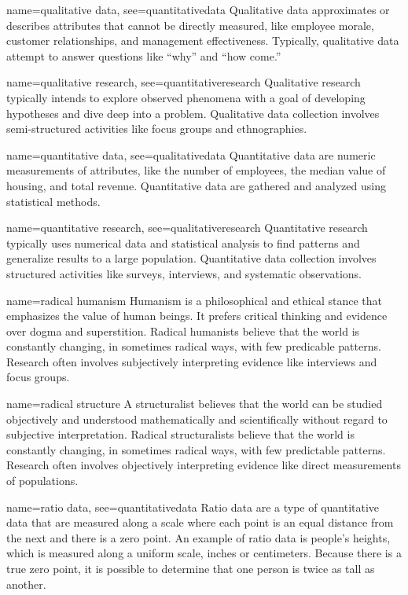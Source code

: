 {name={qualitative data},
	see={quantitativedata}}
{%
	Qualitative data approximates or describes attributes that cannot be directly measured, like employee morale, customer relationships, and management effectiveness. Typically, qualitative data attempt to answer questions like ``why'' and ``how come.'' 
}

{name={qualitative research},
	see={quantitativeresearch}}
{%
	Qualitative research typically intends to explore observed phenomena with a goal of developing hypotheses and dive deep into a problem. Qualitative data collection involves semi-structured activities like focus groups and ethnographies.
}

{name={quantitative data},
	see={qualitativedata}}
{%
	Quantitative data are numeric measurements of attributes, like the number of employees, the median value of housing, and total revenue. Quantitative data are gathered and analyzed using statistical methods.
}

{name={quantitative research},
	see={qualitativeresearch}}
{%
	Quantitative research typically uses numerical data and statistical analysis to find patterns and generalize results to a large population. Quantitative data collection involves structured activities like surveys, interviews, and systematic observations.
}

{name={radical humanism}}
{%
	Humanism is a philosophical and ethical stance that emphasizes the value of human beings. It prefers critical thinking and evidence over dogma and superstition. Radical humanists believe that the world is constantly changing, in sometimes radical ways, with few predicable patterns. Research often involves subjectively interpreting evidence like interviews and focus groups.
}

{name={radical structure}}
{%
	A structuralist believes that the world can be studied objectively and understood mathematically and scientifically without regard to subjective interpretation. Radical structuralists believe that the world is constantly changing, in sometimes radical ways, with few predictable patterns. Research often involves objectively interpreting evidence like direct measurements of populations.
}

{name={ratio data},
	see={quantitativedata}}
{%
	Ratio data are a type of quantitative data that are measured along a scale where each point is an equal distance from the next and there is a zero point. An example of ratio data is people's heights, which is measured along a uniform scale, \eg inches or centimeters. Because there is a true zero point, it is possible to determine that one person is twice as tall as another.
}

